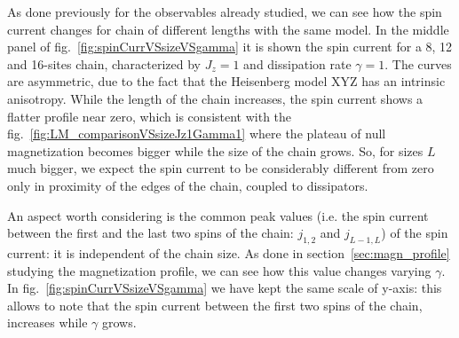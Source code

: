 As done previously for the observables already studied, we can see how the spin current changes for chain of different lengths with the same model. In the middle panel of fig.~\ref{fig:spinCurrVSsizeVSgamma} it is shown the spin current for a 8, 12 and 16-sites chain, characterized by $J_z = 1$ and dissipation rate $\gamma = 1$. The curves are asymmetric, due to the fact that the Heisenberg model XYZ has an intrinsic anisotropy. While the length of the chain increases, the spin current shows a flatter profile near zero, which is consistent with the fig.~\ref{fig:LM_comparisonVSsizeJz1Gamma1} where the plateau of null magnetization becomes bigger while the size of the chain grows. So, for sizes $L$ much bigger, we expect the spin current to be considerably different from zero only in  proximity of the edges of the chain, coupled to dissipators.

An aspect worth considering is the common peak values (i.e. the spin current between the first and the last two spins of the chain: $j_{1,2}$ and $j_{L-1,L}$) of the spin current: it is independent of the chain size. As done in section~\ref{sec:magn_profile} studying the magnetization profile, we can see how this value changes varying $\gamma$. In fig.~\ref{fig:spinCurrVSsizeVSgamma} we have kept the same scale of y-axis: this allows to note that the spin current between the first two spins of the chain, increases while $\gamma$ grows. 

